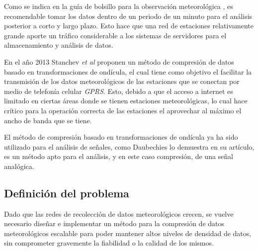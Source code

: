 Como se indica en la guía de bolsillo para la observación meteorológica \cite{Handbook_2000}, es recomendable tomar los datos dentro de un periodo de un minuto para el análisis posterior a corto y largo plazo. Esto hace que una red de estaciones relativamente grande aporte un tráfico considerable a los sistemas de servidores para el almacenamiento y análisis de datos.

En el año 2013 Stanchev \textit{et al} \cite{Improved_Stanchev} proponen un método de compresión de datos basado en transformaciones de ondícula, el cual tiene como objetivo el facilitar la transmisión de los datos meteorológicos de las estaciones que se conectan por medio de telefonía celular \textit{GPRS}. Esto, debido a que el acceso a internet es limitado en ciertas áreas donde se tienen estaciones meteorológicas, lo cual hace crítico para la operación correcta de las estaciones el aprovechar al máximo el ancho de banda que se tiene.

El método de compresión basado en transformaciones de ondícula ya ha sido utilizado para el análisis de señales, como Daubechies \cite{daubechies1990wavelet} lo demuestra en su artículo, es un método apto para el análisis, y en este caso compresión, de una señal analógica.

\subsection{Definición del problema}

Dado que las redes de recolección de datos meteorológicos crecen, se vuelve necesario diseñar e implementar un método para la compresión de datos meteorológicos escalable para poder mantener altos niveles de densidad de datos, sin comprometer gravemente la fiabilidad o la calidad de los mismos.
